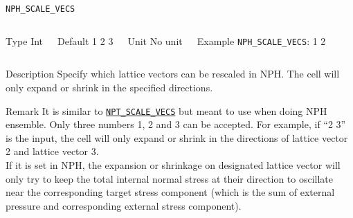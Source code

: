 \begin{frame}[allowframebreaks]{\texttt{NPH\_SCALE\_VECS}} \label{NPH_SCALE_VECS}
\vspace*{-12pt}
\begin{columns}
\begin{block}{Type}
Int
\end{block}

\begin{block}{Default}
1 2 3
\end{block}

\begin{block}{Unit}
No unit
\end{block}

\begin{block}{Example}
\texttt{NPH\_SCALE\_VECS}: 1 2
\end{block}
\end{columns}

\begin{block}{Description}
Specify which lattice vectors can be rescaled in NPH. The cell will only expand or shrink in the specified directions.

\end{block}

\begin{block}{Remark}
It is similar to \hyperlink{NPT_SCALE_VECS}{\texttt{NPT\_SCALE\_VECS}} but meant to use when doing NPH ensemble. Only three numbers 1, 2 and 3 can be accepted. For example, if ``2 3'' is the input, the cell will only expand or shrink in the directions of lattice vector 2 and lattice vector 3.
\\
If it is set in NPH, the expansion or shrinkage on designated lattice vector will only try to keep the total internal normal stress at their direction to oscillate near the corresponding target stress component (which is the sum of external pressure and corresponding external stress component).
\end{block}

\end{frame}



